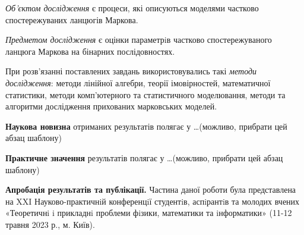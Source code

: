 \emph{Об'єктом дослідження} є процеси, які описуються моделями частково спостережуваних ланцюгів Маркова.

\emph{Предметом дослідження} є оцінки параметрiв частково спостережуваного ланцюга Маркова на бінарних послідовностях.

При розв’язанні поставлених завдань використовувались такі \emph{методи дослідження}: методи лінійної  алгебри, теорії імовірностей, математичної статистики, методи комп’ютерного та статистичного моделювання, методи та алгоритми дослідження прихованих марковських моделей.

\textbf{Наукова новизна} отриманих результатів полягає у \dots (можливо, прибрати цей абзац шаблону)

\textbf{Практичне значення} результатів полягає у \dots (можливо, прибрати цей абзац шаблону)

\textbf{Апробація результатів та публікації.} Частина даної роботи була представлена на XXI Науково-практичнiй конференцiї студентiв, аспiрантiв та молодих вчених «Теоретичнi i прикладнi проблеми фiзики, математики та iнформатики» (11-12 травня 2023 р., м. Київ).
